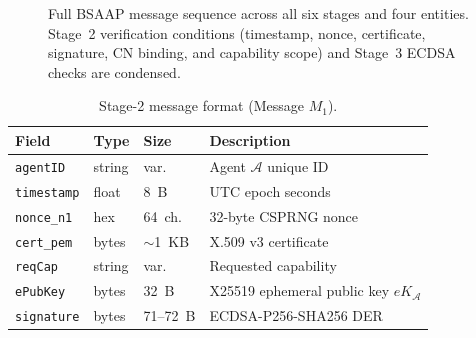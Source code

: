 \documentclass[review,5p,twocolumn,times]{elsarticle}
\begin{document}
\begin{figure}[!ht]
\caption{Full BSAAP message sequence across all six stages and four entities.
  Stage~2 verification conditions (timestamp, nonce, certificate, signature,
  CN binding, and capability scope) and Stage~3 ECDSA checks are condensed.}
\label{fig:seq}
\end{figure}

\begin{table}[H]
\centering
\caption{Stage-2 message format (Message $M_1$).}
\label{tab:s2msg}
\small
\begin{tabular}{@{}llll@{}}
\toprule
\textbf{Field} & \textbf{Type} & \textbf{Size} & \textbf{Description}\\
\midrule
\texttt{agentID}   & string & var.    & Agent $\mathcal{A}$ unique ID\\
\texttt{timestamp} & float  & 8~B     & UTC epoch seconds\\
\texttt{nonce\_n1} & hex    & 64~ch.  & 32-byte CSPRNG nonce\\
\texttt{cert\_pem} & bytes  & $\sim$1~KB & X.509 v3 certificate\\
\texttt{reqCap}    & string & var.    & Requested capability\\
\texttt{ePubKey}   & bytes  & 32~B   & X25519 ephemeral public key $eK_\mathcal{A}$\\
\texttt{signature} & bytes  & 71--72~B & ECDSA-P256-SHA256 DER\\
\bottomrule
\end{tabular}
\end{table}
\end{document}
